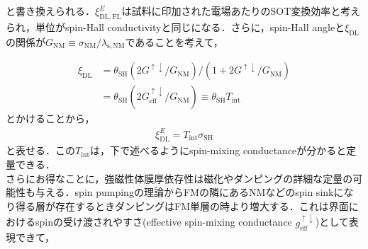 \documentclass[12pt]{jsbook}
\begin{document}
と書き換えられる．$\xi_{\mathrm{DL,FL}}^{E}$は試料に印加された電場あたりのSOT変換効率と考えられ，単位がspin-Hall conductivityと同じになる．さらに，spin-Hall angleと$\xi_\mathrm{DL}$の関係が$G_{\mathrm{NM}} \equiv \sigma_{\mathrm{NM}} / \lambda_{\mathrm{s}, \mathrm{NM}}$であることを考えて，

\begin{eqnarray}
\xi_{\mathrm{DL}} &=\nonumber \theta_{\mathrm{SH}}\left(2 G^{\uparrow \downarrow} / G_{\mathrm{NM}}\right) /\left(1+2 G^{\uparrow \downarrow} / G_{\mathrm{NM}}\right) \\
&=\theta_{\mathrm{SH}}\left(2 G_{\mathrm{eff}}^{\uparrow \downarrow} / G_{\mathrm{NM}}\right) \equiv \theta_{\mathrm{SH}} T_{\mathrm{int}}
\end{eqnarray}
とかけることから，
\begin{eqnarray}
\xi_\mathrm{DL}^E = T_\mathrm{int}\sigma_\mathrm{SH}	
\end{eqnarray}
と表せる．この$T_\mathrm{int}$は，下で述べるようにspin-mixing conductanceが分かると定量できる．\\



さらにお得なことに，強磁性体膜厚依存性は磁化やダンピングの詳細な定量の可能性も与える．spin pumpingの理論からFMの隣にあるNMなどのspin sinkになり得る層が存在するときダンピングはFM単層の時より増大する．これは界面におけるspinの受け渡されやすさ(effective spin-mixing conductance $g_{\mathrm{eff}}^{\uparrow \downarrow}$)として表現できて，
\end{document}
